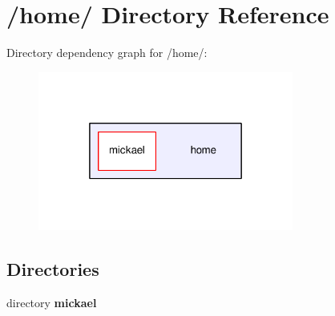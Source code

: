 \section{/home/ Directory Reference}
\label{dir_75b82e7e4a5feb05200b9ad7adf06257}
Directory dependency graph for /home/\-:\nopagebreak
\begin{figure}[H]
\begin{center}
\leavevmode
\includegraphics[width=238pt]{dir_75b82e7e4a5feb05200b9ad7adf06257_dep}
\end{center}
\end{figure}
\subsection*{Directories}
\begin{DoxyCompactItemize}
\item 
directory {\bf mickael}
\end{DoxyCompactItemize}
